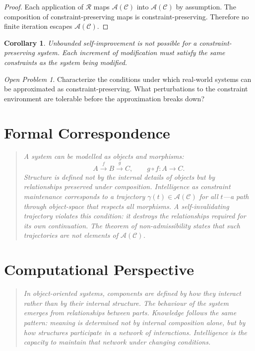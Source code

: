 \documentclass[11pt]{book}
\theoremstyle{plain}
\newtheorem{corollary}[theorem]{Corollary}
\theoremstyle{definition}
\theoremstyle{remark}
\newtheorem{openproblem}[theorem]{Open Problem}
\newcommand{\C}{\mathcal{C}}
\newcommand{\A}{\mathcal{A}}
\newenvironment{formalcorrespondence}
  {\begin{quote}\small\itshape}
  {\end{quote}}
\newenvironment{computationalaside}
  {\begin{quote}\small\itshape}
  {\end{quote}}
\begin{document}
\begin{proof}
Each application of $\mathcal{R}$ maps $\A(\C)$ into $\A(\C)$ by assumption.
The composition of constraint-preserving maps is constraint-preserving.
Therefore no finite iteration escapes $\A(\C)$.
\end{proof}

\begin{corollary}
Unbounded self-improvement is not possible for a constraint-preserving
system. Each increment of modification must satisfy the same constraints
as the system being modified.
\end{corollary}

\begin{openproblem}
Characterize the conditions under which real-world systems can be
approximated as constraint-preserving. What perturbations to the
constraint environment are tolerable before the approximation breaks down?
\end{openproblem}

\section*{Formal Correspondence}
\begin{formalcorrespondence}
A system can be modelled as objects and morphisms:
\[
  A \xrightarrow{f} B \xrightarrow{g} C, \qquad g \circ f : A \to C.
\]
Structure is defined not by the internal details of objects but by
relationships preserved under composition. Intelligence as constraint
maintenance corresponds to a trajectory $\gamma(t) \in \A(\C)$ for all
$t$---a path through object-space that respects all morphisms. A
self-invalidating trajectory violates this condition: it destroys the
relationships required for its own continuation. The theorem of
non-admissibility states that such trajectories are not elements of
$\A(\C)$.
\end{formalcorrespondence}

\section*{Computational Perspective}
\begin{computationalaside}
In object-oriented systems, components are defined by how they interact
rather than by their internal structure. The behaviour of the system
emerges from relationships between parts. Knowledge follows the same
pattern: meaning is determined not by internal composition alone, but by
how structures participate in a network of interactions. Intelligence
is the capacity to maintain that network under changing conditions.
\end{computationalaside}
\end{document}
